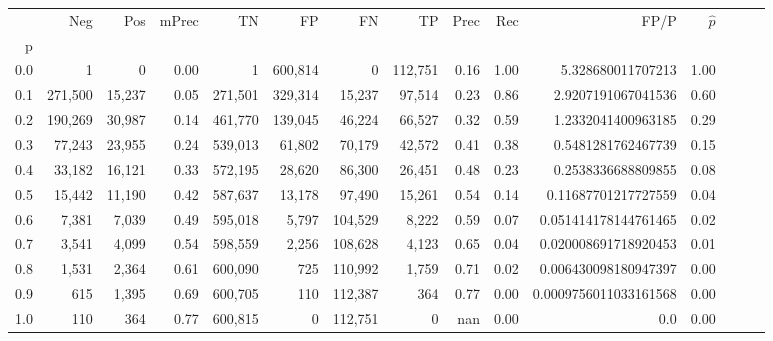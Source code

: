 \begin{tabular}{rrrrrrrrrrrrrrr}
\toprule
{} &      Neg &     Pos & mPrec &       TN &       FP &       FN &       TP &  Prec &   Rec &                   FP/P & $\hat{p}$ \\
p   &          &         &       &          &          &          &          &       &       &                        &           \\
\midrule
0.0 &        1 &       0 &  0.00 &        1 &  600,814 &        0 &  112,751 &  0.16 &  1.00 &      5.328680011707213 &      1.00 \\
0.1 &  271,500 &  15,237 &  0.05 &  271,501 &  329,314 &   15,237 &   97,514 &  0.23 &  0.86 &     2.9207191067041536 &      0.60 \\
0.2 &  190,269 &  30,987 &  0.14 &  461,770 &  139,045 &   46,224 &   66,527 &  0.32 &  0.59 &     1.2332041400963185 &      0.29 \\
0.3 &   77,243 &  23,955 &  0.24 &  539,013 &   61,802 &   70,179 &   42,572 &  0.41 &  0.38 &     0.5481281762467739 &      0.15 \\
0.4 &   33,182 &  16,121 &  0.33 &  572,195 &   28,620 &   86,300 &   26,451 &  0.48 &  0.23 &     0.2538336688809855 &      0.08 \\
0.5 &   15,442 &  11,190 &  0.42 &  587,637 &   13,178 &   97,490 &   15,261 &  0.54 &  0.14 &    0.11687701217727559 &      0.04 \\
0.6 &    7,381 &   7,039 &  0.49 &  595,018 &    5,797 &  104,529 &    8,222 &  0.59 &  0.07 &   0.051414178144761465 &      0.02 \\
0.7 &    3,541 &   4,099 &  0.54 &  598,559 &    2,256 &  108,628 &    4,123 &  0.65 &  0.04 &   0.020008691718920453 &      0.01 \\
0.8 &    1,531 &   2,364 &  0.61 &  600,090 &      725 &  110,992 &    1,759 &  0.71 &  0.02 &   0.006430098180947397 &      0.00 \\
0.9 &      615 &   1,395 &  0.69 &  600,705 &      110 &  112,387 &      364 &  0.77 &  0.00 &  0.0009756011033161568 &      0.00 \\
1.0 &      110 &     364 &  0.77 &  600,815 &        0 &  112,751 &        0 &   nan &  0.00 &                    0.0 &      0.00 \\
\bottomrule
\end{tabular}
